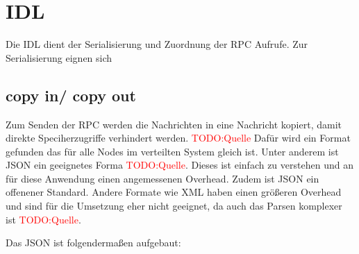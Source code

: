 \section{IDL}

Die IDL dient der Serialisierung und Zuordnung der RPC Aufrufe. Zur Serialisierung eignen sich 
\subsection{copy in/ copy out}
Zum Senden der RPC werden die Nachrichten in eine Nachricht kopiert, damit direkte Speciherzugriffe verhindert werden.  \textcolor{red}{TODO:Quelle} Dafür wird ein Format gefunden das für alle Nodes im verteilten System gleich ist. Unter anderem ist JSON ein geeignetes Forma  \textcolor{red}{TODO:Quelle}.  Dieses ist einfach zu verstehen und an für diese Anwendung einen angemessenen Overhead. Zudem ist JSON ein offenener Standard. Andere Formate wie XML haben einen größeren Overhead und sind für die Umsetzung eher nicht geeignet, da auch das Parsen komplexer ist  \textcolor{red}{TODO:Quelle}.  

Das JSON ist folgendermaßen aufgebaut:








